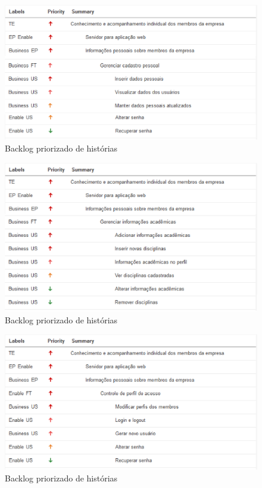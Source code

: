 \begin{figure}[H]
    \centering
    \includegraphics[keepaspectratio=true,scale=0.6]{figuras/blus01.eps}
    \caption[Backlog história]{Backlog priorizado de histórias\label{backlogus01}}
\end{figure}

\begin{figure}[H]
    \centering
    \includegraphics[keepaspectratio=true,scale=0.6]{figuras/blus02.eps}
    \caption[Backlog história]{Backlog priorizado de histórias\label{backlogus02}}
\end{figure}

\begin{figure}[H]
    \centering
    \includegraphics[keepaspectratio=true,scale=0.6]{figuras/blus03.eps}
    \caption[Backlog história]{Backlog priorizado de histórias\label{backlogus03}}
\end{figure}

